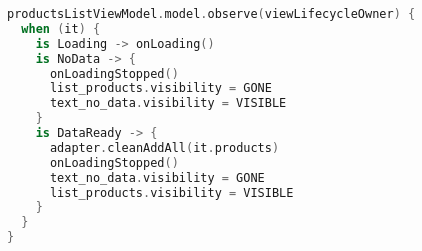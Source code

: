 \begin{lstlisting}[language=Kotlin, captionpos=b,
label={lis:android-subscription},
caption={Пример реализации подписки на ViewModel}
]
productsListViewModel.model.observe(viewLifecycleOwner) {
  when (it) {
    is Loading -> onLoading()
    is NoData -> {
      onLoadingStopped()
      list_products.visibility = GONE
      text_no_data.visibility = VISIBLE
    }
    is DataReady -> {
      adapter.cleanAddAll(it.products)
      onLoadingStopped()
      text_no_data.visibility = GONE
      list_products.visibility = VISIBLE
    }
  }
}
\end{lstlisting}